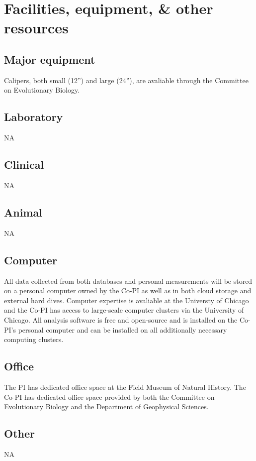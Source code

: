 \section{Facilities, equipment, \& other resources}

\subsection{Major equipment}
Calipers, both small (12'') and large (24''), are avaliable through the Committee on Evolutionary Biology.

\subsection{Laboratory}
NA

\subsection{Clinical}
NA

\subsection{Animal}
NA

\subsection{Computer}
All data collected from both databases and personal measurements will be stored on a personal computer owned by the Co-PI as well as in both cloud storage and external hard dives. Computer expertise is avaliable at the Universty of Chicago and the Co-PI has access to large-scale computer clusters via the University of Chicago. All analysis software is free and open-source and is installed on the Co-PI's personal computer and can be installed on all additionally necessary computing clusters.

\subsection{Office}
The PI has dedicated office space at the Field Museum of Natural History. The Co-PI has dedicated office space provided by both the Committee on Evolutionary Biology and the Department of Geophysical Sciences.

\subsection{Other}
NA
